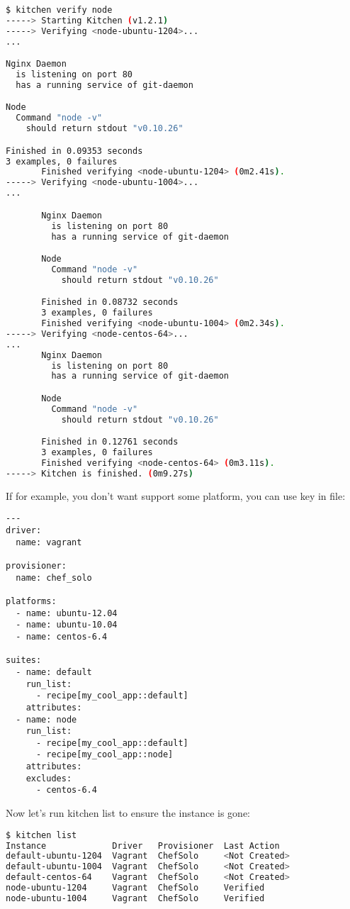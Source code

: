 \begin{lstlisting}[language=Bash,label=lst:testing-test-kitchen42]
$ kitchen verify node
-----> Starting Kitchen (v1.2.1)
-----> Verifying <node-ubuntu-1204>...
...

Nginx Daemon
  is listening on port 80
  has a running service of git-daemon

Node
  Command "node -v"
    should return stdout "v0.10.26"

Finished in 0.09353 seconds
3 examples, 0 failures
       Finished verifying <node-ubuntu-1204> (0m2.41s).
-----> Verifying <node-ubuntu-1004>...
...

       Nginx Daemon
         is listening on port 80
         has a running service of git-daemon

       Node
         Command "node -v"
           should return stdout "v0.10.26"

       Finished in 0.08732 seconds
       3 examples, 0 failures
       Finished verifying <node-ubuntu-1004> (0m2.34s).
-----> Verifying <node-centos-64>...
...
       Nginx Daemon
         is listening on port 80
         has a running service of git-daemon

       Node
         Command "node -v"
           should return stdout "v0.10.26"

       Finished in 0.12761 seconds
       3 examples, 0 failures
       Finished verifying <node-centos-64> (0m3.11s).
-----> Kitchen is finished. (0m9.27s)
\end{lstlisting}

If for example, you don't want support some platform, you can use  key in  file:

\begin{lstlisting}[label=lst:testing-test-kitchen43]
---
driver:
  name: vagrant

provisioner:
  name: chef_solo

platforms:
  - name: ubuntu-12.04
  - name: ubuntu-10.04
  - name: centos-6.4

suites:
  - name: default
    run_list:
      - recipe[my_cool_app::default]
    attributes:
  - name: node
    run_list:
      - recipe[my_cool_app::default]
      - recipe[my_cool_app::node]
    attributes:
    excludes:
      - centos-6.4
\end{lstlisting}

Now let's run kitchen list to ensure the instance is gone:

\begin{lstlisting}[language=Bash,label=lst:testing-test-kitchen44]
$ kitchen list
Instance             Driver   Provisioner  Last Action
default-ubuntu-1204  Vagrant  ChefSolo     <Not Created>
default-ubuntu-1004  Vagrant  ChefSolo     <Not Created>
default-centos-64    Vagrant  ChefSolo     <Not Created>
node-ubuntu-1204     Vagrant  ChefSolo     Verified
node-ubuntu-1004     Vagrant  ChefSolo     Verified
\end{lstlisting}